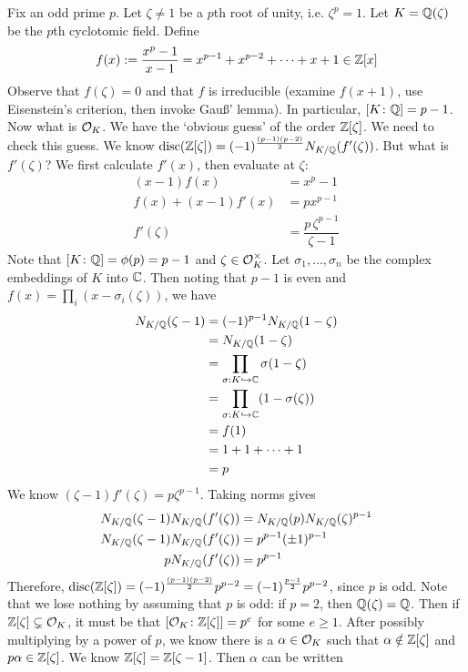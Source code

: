 \begin{ex}
Fix an odd prime $p$. Let $\zeta \neq 1$ be a $p$th root of unity, i.e. $\zeta^p=1$. Let $K=\mathbb{Q}(\zeta)$ be the $p$th cyclotomic field. Define
	\[
	f(x):= \dfrac{x^p-1}{x-1}= x^{p-1} + x^{p-2} + \cdots + x + 1 \in \mathbb{Z}[x]
	\]
Observe that $f(\zeta)=0$ and that $f$ is irreducible (examine $f(x+1)$, use Eisenstein's criterion, then invoke Gau\ss' lemma). In particular, $[K\colon \mathbb{Q}]=p-1$. Now what is $\mathcal{O}_K$. We have the `obvious guess' of the order $\mathbb{Z}[\zeta]$. We need to check this guess. We know $\operatorname{disc}(\mathbb{Z}[\zeta])= (-1)^{\frac{(p-1)(p-2)}{2}} N_{K/\mathbb{Q}}(f'(\zeta))$. But what is $f'(\zeta)$? We first calculate $f'(x)$, then evaluate at $\zeta$:
	\[
	\begin{split}
	(x-1)f(x)&= x^p - 1 \\
	f(x) + (x-1) f'(x)&= p x^{p-1} \\
	f'(\zeta)&= \dfrac{p \,\zeta^{p-1}}{\zeta-1}
	\end{split}
	\]
Note that $[K \colon \mathbb{Q}]= \phi(p)=p-1$ and $\zeta \in \mathcal{O}_K^\times$. Let $\sigma_1,\ldots,\sigma_n$ be the complex embeddings of $K$ into $\mathbb{C}$. Then noting that $p-1$ is even and $f(x)=\prod_i (x-\sigma_i(\zeta))$, we have
	\[
	\begin{split}
	N_{K/\mathbb{Q}}(\zeta-1)&= (-1)^{p-1} N_{K/\mathbb{Q}}(1-\zeta) \\
	&=N_{K/\mathbb{Q}}(1-\zeta) \\
	&=\prod_{\sigma: K \hookrightarrow \mathbb{C}} \sigma(1-\zeta) \\
	&= \prod_{\sigma: K \hookrightarrow \mathbb{C}} (1-\sigma(\zeta)) \\
	&= f(1) \\
	&= 1 + 1 + \cdots + 1 \\
	&= p
	\end{split}
	\]
We know $(\zeta -1) f'(\zeta) = p \zeta^{p-1}$. Taking norms gives
	\[
	\begin{split}
	N_{K/\mathbb{Q}}(\zeta-1) N_{K/\mathbb{Q}}(f'(\zeta))&= N_{K/\mathbb{Q}}(p) N_{K/\mathbb{Q}}(\zeta)^{p-1} \\
	N_{K/\mathbb{Q}}(\zeta-1) N_{K/\mathbb{Q}}(f'(\zeta))&= p^{p-1} (\pm 1)^{p-1} \\
	p N_{K/\mathbb{Q}}(f'(\zeta))&= p^{p-1}
	\end{split}
	\]
Therefore, $\operatorname{disc}(\mathbb{Z}[\zeta])= (-1)^{\frac{(p-1)(p-2)}{2}} p^{p-2}=(-1)^{\frac{p-1}{2}} p^{p-2}$, since $p$ is odd. Note that we lose nothing by assuming that $p$ is odd: if $p=2$, then $\mathbb{Q}(\zeta)=\mathbb{Q}$. Then if $\mathbb{Z}[\zeta] \subsetneq \mathcal{O}_K$, it must be that $[\mathcal{O}_K \colon \mathbb{Z}[\zeta]]=p^e$ for some $e \geq 1$. After possibly multiplying by a power of $p$, we know there is a $\alpha \in \mathcal{O}_K$ such that $\alpha \notin \mathbb{Z}[\zeta]$ and $p\alpha \in \mathbb{Z}[\zeta]$. We know $\mathbb{Z}[\zeta]= \mathbb{Z}[\zeta-1]$. Then $\alpha$ can be written

\end{ex}
